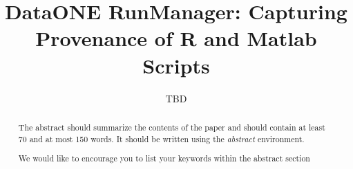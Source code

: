 \documentclass[runningheads,a4paper]{llncs}
\newcommand{\keywords}[1]{\par\addvspace\baselineskip
\noindent\keywordname\enspace\ignorespaces#1}
\begin{document}
\mainmatter  %

\title{DataONE RunManager: Capturing Provenance of R and Matlab Scripts}


%
%
\author{
TBD
%


%
%

\maketitle


\begin{abstract}
The abstract should summarize the contents of the paper and should
contain at least 70 and at most 150 words. It should be written using the
\emph{abstract} environment.
\keywords{We would like to encourage you to list your keywords within
the abstract section}
\end{abstract}


}
\end{document}
